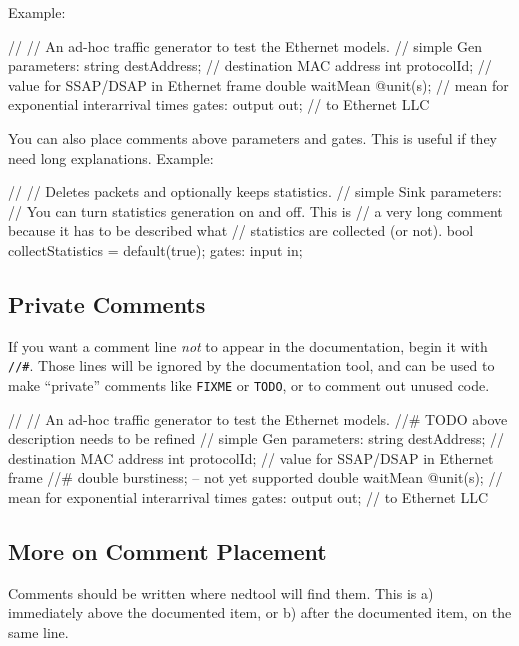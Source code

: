 Example:

\begin{ned}
//
// An ad-hoc traffic generator to test the Ethernet models.
//
simple Gen
{
    parameters:
        string destAddress;  // destination MAC address
        int protocolId;      // value for SSAP/DSAP in Ethernet frame
        double waitMean @unit(s); // mean for exponential interarrival times
    gates:
        output out;  // to Ethernet LLC
}
\end{ned}

You can also place comments above parameters and gates. This is useful
if they need long explanations. Example:

\begin{ned}
//
// Deletes packets and optionally keeps statistics.
//
simple Sink
{
    parameters:
        // You can turn statistics generation on and off. This is
        // a very long comment because it has to be described what
        // statistics are collected (or not).
        bool collectStatistics = default(true);
    gates:
        input in;
}
\end{ned}

\subsection{Private Comments}

If you want a comment line \textit{not} to appear in the documentation,
begin it with \texttt{//\#}. Those lines will be ignored by the
documentation tool, and can be used to make ``private'' comments
like \texttt{FIXME} or \texttt{TODO}, or to comment out unused code.

\begin{ned}
//
// An ad-hoc traffic generator to test the Ethernet models.
//# TODO above description needs to be refined
//
simple Gen
{
    parameters:
        string destAddress;  // destination MAC address
        int protocolId;      // value for SSAP/DSAP in Ethernet frame
        //# double burstiness;  -- not yet supported
        double waitMean @unit(s); // mean for exponential interarrival times
    gates:
        output out;  // to Ethernet LLC
}
\end{ned}


\subsection{More on Comment Placement}

Comments should be written where nedtool will find them.
This is a) immediately above the documented item, or b) after the
documented item, on the same line.

